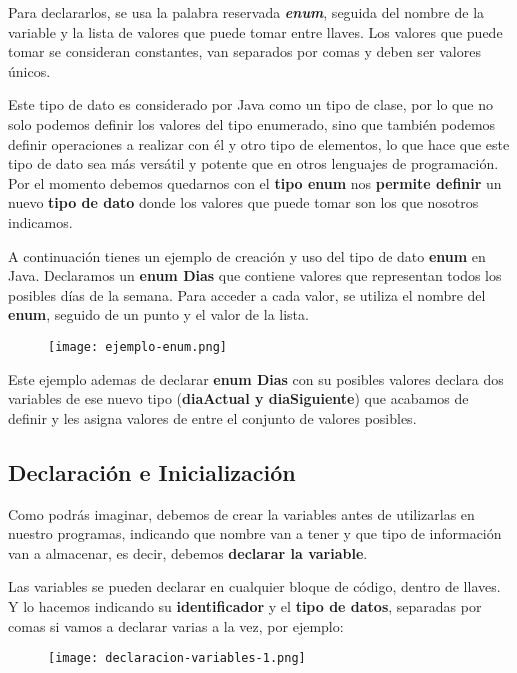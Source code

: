 Para declararlos, se usa la palabra reservada \textbf{\textit{enum}}, seguida del nombre de la variable y la lista de valores que puede tomar entre llaves. Los valores que puede tomar se consideran constantes, van separados por comas y deben ser valores únicos.

Este tipo de dato es considerado por Java como un tipo de clase, por lo que no solo podemos definir los valores del tipo enumerado, sino que también podemos definir operaciones a realizar con él y otro tipo de elementos, lo que hace que este tipo de dato sea más versátil y potente que en otros lenguajes de programación. Por el momento debemos quedarnos con el \textbf{tipo enum} nos \textbf{permite definir} un nuevo \textbf{tipo de dato} donde los valores que puede tomar son los que nosotros indicamos.

A continuación tienes un ejemplo de creación y uso del tipo de dato \textbf{enum} en Java. Declaramos un \textbf{enum Dias} que contiene valores que representan todos los posibles días de la semana. Para acceder a cada valor, se utiliza el nombre del \textbf{enum}, seguido de un punto y el valor de la lista.

\begin{figure}[H]
    \texttt{[image: ejemplo-enum.png]}
\end{figure}

Este ejemplo ademas de declarar \textbf{enum Dias} con su posibles valores declara dos variables de ese nuevo tipo (\textbf{diaActual y diaSiguiente}) que acabamos de definir y les asigna valores de entre el conjunto de valores posibles.

\subsection{Declaración e Inicialización}
Como podrás imaginar, debemos de crear la variables antes de utilizarlas en nuestro programas, indicando que nombre van a tener y que tipo de información van a almacenar, es decir, debemos \textbf{declarar la variable}.

Las variables se pueden declarar en cualquier bloque de código, dentro de llaves. Y lo hacemos indicando su \textbf{identificador} y el \textbf{tipo de datos}, separadas por comas si vamos a declarar varias a la vez, por ejemplo:

\begin{figure}[H]
    \texttt{[image: declaracion-variables-1.png]}
\end{figure}


